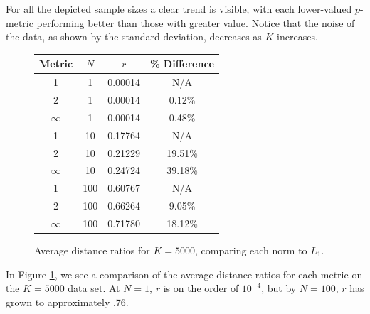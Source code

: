 \documentclass{article}
\begin{document}
For all the depicted sample sizes a clear trend is visible, with each lower-valued $p$-metric performing better than those with greater value. Notice that the noise of the data, as shown by the standard deviation, decreases as $K$ increases.
\
\begin{figure}[H]
\centering
\begin{tabular}{|c|c|c|c|}
\hline
Metric & $N$ & $r$ & \% Difference\\
\hline
1 & 1 & 0.00014 & N/A\\
2 & 1 & 0.00014 & 0.12\%\\
$\infty$ & 1 & 0.00014 & 0.48\%\\
\hline
1 & 10 & 0.17764 & N/A\\
2 & 10 & 0.21229 & 19.51\%\\
$\infty$ & 10 & 0.24724 & 39.18\%\\
\hline
1 & 100 & 0.60767 & N/A\\
2 & 100 & 0.66264 & 9.05\%\\
$\infty$ & 100 & 0.71780 & 18.12\%\\
\hline
\end{tabular}
\caption{Average distance ratios for $K=5000$, comparing each norm to $L_1$.}
\label{fig:exp11data}
\end{figure}
In Figure \ref{fig:exp11data}, we see a comparison of the average distance ratios for each metric on the $K=5000$ data set. At $N=1$, $r$ is on the order of $10^{-4}$, but by $N=100$, $r$ has grown to approximately .76.
\end{document}
